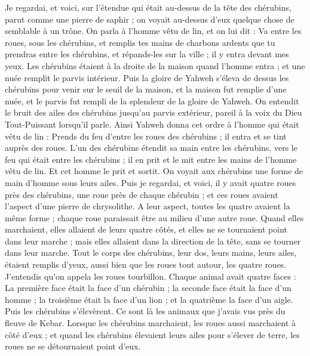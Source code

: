 \begin{multicols}{2}
\VerseOne{}Je regardai, et voici, sur l’étendue qui était au-dessus de la tête des chérubins, parut comme une pierre de saphir ; on voyait au-dessus d’eux quelque chose de semblable à un trône.
On parla à l'homme vêtu de lin, et on lui dit : Va entre les roues, sous les chérubins, et remplis tes mains de charbons ardents que tu prendras entre  les chérubins, et répands-les sur la ville ; il y entra devant mes yeux.
Les chérubins étaient à la droite de la maison quand l'homme entra ; et une nuée remplit le parvis intérieur.
Puis la gloire de Yahweh s'éleva de dessus les chérubins pour venir sur le seuil de la maison, et la maison fut remplie d'une nuée, et le parvis fut rempli de la splendeur de la gloire de Yahweh.
On entendit le bruit des ailes des chérubins jusqu'au parvis extérieur, pareil à la voix du Dieu Tout-Puissant lorsqu’il parle.
Ainsi Yahweh donna cet ordre à l'homme qui était vêtu de lin : Prends du feu d’entre les roues des chérubins ; il entra et se tint auprès des roues.
L'un des chérubins étendit sa main entre les chérubins, vers le feu qui était entre les chérubins ; il en prit et le mit entre les mains de l'homme vêtu de lin. Et cet homme le prit et sortit.
On voyait aux chérubins une forme de main d'homme sous leurs ailes.
Puis je regardai, et voici, il y avait quatre roues près des chérubins, une roue près de chaque chérubin ; et ces roues avaient l’aspect d'une pierre de chrysolithe.
A leur aspect, toutes les quatre avaient la même forme ; chaque roue paraissait être au milieu d'une autre roue.
Quand elles marchaient, elles allaient de leurs quatre côtés, et elles ne se tournaient point dans leur marche ; mais elles allaient dans la direction de la tête, sans se tourner dans leur marche.
Tout le corps des chérubins, leur dos, leurs mains, leurs ailes, étaient remplis d'yeux, aussi bien que les roues tout autour, les quatre roues.
J’entendis qu’on appela les roues tourbillon.
Chaque animal avait quatre faces : La première face était la face d'un chérubin ; la seconde face était la face d'un homme ; la troisième était la face d'un lion ; et la quatrième la face d'un aigle.
Puis les chérubins s'élevèrent. Ce sont là les animaux que j'avais vus près du fleuve de Kebar.
Lorsque les chérubins marchaient, les roues aussi marchaient à côté d'eux ; et quand les chérubins élevaient leurs ailes pour s'élever de terre, les roues ne se détournaient point d'eux.

\end{multicols}
